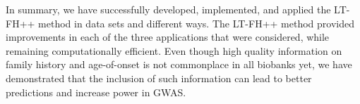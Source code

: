 In summary, we have successfully developed, implemented, and applied the LT-FH++ method in data sets and different ways. The LT-FH++ method provided improvements in each of the three applications that were considered, while remaining computationally efficient. Even though high quality information on family history and age-of-onset is not commonplace in all biobanks yet, we have demonstrated that the inclusion of such information can lead to better predictions and increase power in GWAS.

